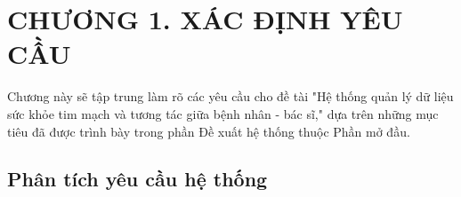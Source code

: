 
\section*{CHƯƠNG 1. XÁC ĐỊNH YÊU CẦU}
\setcounter{section}{1}
\setcounter{subsection}{0} %
\setcounter{table}{0} %
\setcounter{figure}{0} %
Chương này sẽ tập trung làm rõ các yêu cầu cho đề tài "Hệ thống quản lý dữ liệu sức khỏe tim mạch và tương tác giữa bệnh nhân - bác sĩ," dựa trên những mục tiêu đã được trình bày trong phần Đề xuất hệ thống thuộc Phần mở đầu.

\subsection{Phân tích yêu cầu hệ thống}
